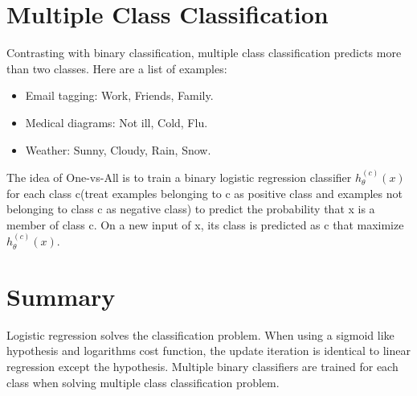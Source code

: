 \documentclass{article}
\begin{document}
\section{Multiple Class Classification}
Contrasting with binary classification, multiple class classification predicts more than two classes. Here are a list of examples:
\begin{itemize}
\item Email tagging: Work, Friends, Family.
\item Medical diagrams: Not ill, Cold, Flu.
\item Weather: Sunny, Cloudy, Rain, Snow.
\end{itemize}
The idea of One-vs-All is to train a binary logistic regression classifier $h_{\theta}^{(c)}(x)$ for each class c(treat examples belonging to c as positive class and examples not belonging to class c as negative class) to predict the probability that x is a member of class c. On a new input of x, its class is predicted as c that maximize $h_{\theta}^{(c)}(x)$.

\section{Summary}
Logistic regression solves the classification problem. When using a sigmoid like hypothesis and logarithms cost function, the update iteration is identical to linear regression except the hypothesis. Multiple binary classifiers are trained for each class when solving multiple class classification problem.
\end{document}
